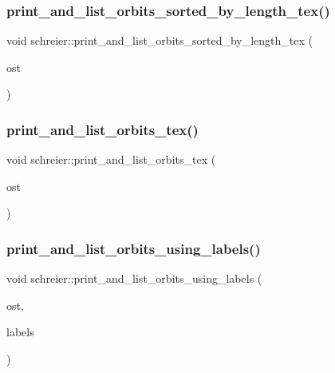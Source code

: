 \subsubsection{\texorpdfstring{print\+\_\+and\+\_\+list\+\_\+orbits\+\_\+sorted\+\_\+by\+\_\+length\+\_\+tex()}{print\_and\_list\_orbits\_sorted\_by\_length\_tex()}}
{\footnotesize\ttfamily void schreier\+::print\+\_\+and\+\_\+list\+\_\+orbits\+\_\+sorted\+\_\+by\+\_\+length\+\_\+tex (\begin{DoxyParamCaption}\item[{ostream \&}]{ost }\end{DoxyParamCaption})}

\mbox{\label{classschreier_a7f8765a19e7c786b37d252fcd2c37a35}} 
\subsubsection{\texorpdfstring{print\+\_\+and\+\_\+list\+\_\+orbits\+\_\+tex()}{print\_and\_list\_orbits\_tex()}}
{\footnotesize\ttfamily void schreier\+::print\+\_\+and\+\_\+list\+\_\+orbits\+\_\+tex (\begin{DoxyParamCaption}\item[{ostream \&}]{ost }\end{DoxyParamCaption})}

\mbox{\label{classschreier_acd69bf19aa5ce441c7cd0c3fdc32ad44}} 
\subsubsection{\texorpdfstring{print\+\_\+and\+\_\+list\+\_\+orbits\+\_\+using\+\_\+labels()}{print\_and\_list\_orbits\_using\_labels()}}
{\footnotesize\ttfamily void schreier\+::print\+\_\+and\+\_\+list\+\_\+orbits\+\_\+using\+\_\+labels (\begin{DoxyParamCaption}\item[{ostream \&}]{ost,  }\item[{\mbox{\hyperlink{galois_8h_a09fddde158a3a20bd2dcadb609de11dc}{I\+NT}} $\ast$}]{labels }\end{DoxyParamCaption})}

